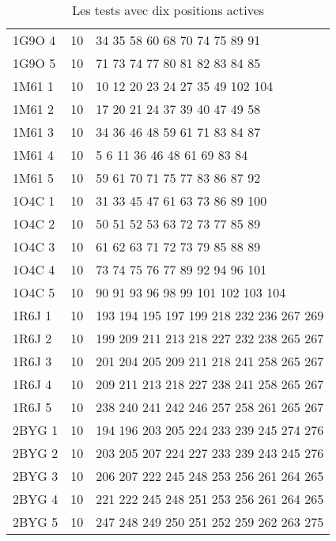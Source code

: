 \begin{table}[!htbp]
{\begin{tabular}{lll}
        1G9O 4 & 10 & 34 35 58 60 68 70 74 75 89 91 \\
        1G9O 5 & 10 & 71 73 74 77 80 81 82 83 84 85 \\
        1M61 1 & 10 & 10 12 20 23 24 27 35 49 102 104 \\
        1M61 2 & 10 & 17 20 21 24 37 39 40 47 49 58 \\
        1M61 3 & 10 & 34 36 46 48 59 61 71 83 84 87 \\
        1M61 4 & 10 & 5 6 11 36 46 48 61 69 83 84 \\
        1M61 5 & 10 & 59 61 70 71 75 77 83 86 87 92 \\
        1O4C 1 & 10 & 31 33 45 47 61 63 73 86 89 100 \\
        1O4C 2 & 10 & 50 51 52 53 63 72 73 77 85 89 \\
        1O4C 3 & 10 & 61 62 63 71 72 73 79 85 88 89 \\
        1O4C 4 & 10 & 73 74 75 76 77 89 92 94 96 101 \\
        1O4C 5 & 10 & 90 91 93 96 98 99 101 102 103 104 \\
        1R6J 1 & 10 & 193 194 195 197 199 218 232 236 267 269 \\
        1R6J 2 & 10 & 199 209 211 213 218 227 232 238 265 267 \\
        1R6J 3 & 10 & 201 204 205 209 211 218 241 258 265 267 \\
        1R6J 4 & 10 & 209 211 213 218 227 238 241 258 265 267 \\
        1R6J 5 & 10 & 238 240 241 242 246 257 258 261 265 267 \\
        2BYG 1 & 10 & 194 196 203 205 224 233 239 245 274 276 \\
        2BYG 2 & 10 & 203 205 207 224 227 233 239 243 245 276 \\
        2BYG 3 & 10 & 206 207 222 245 248 253 256 261 264 265 \\
        2BYG 4 & 10 & 221 222 245 248 251 253 256 261 264 265 \\
        2BYG 5 & 10 & 247 248 249 250 251 252 259 262 263 275 \\

        \bottomrule

      \end{tabular}
}      
      \caption{Les tests avec dix positions actives}
\label{tab:test10}      
    \end{table}


